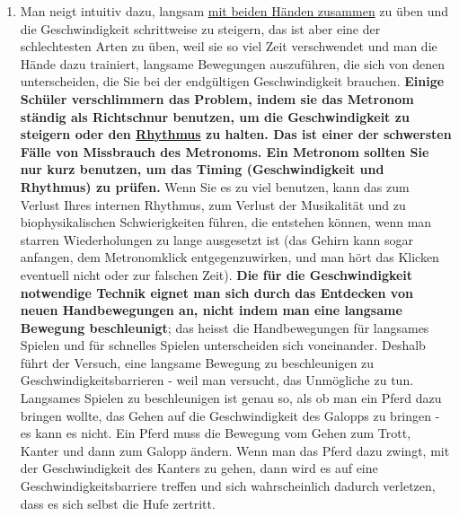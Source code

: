 \begin{enumerate}[label={\arabic*.}]
\item Man neigt intuitiv dazu, langsam \hyperref[c1ii25]{mit beiden Händen zusammen} zu üben und die Geschwindigkeit schrittweise zu steigern, das ist aber eine der schlechtesten Arten zu üben, weil sie so viel Zeit verschwendet und man die Hände dazu trainiert, langsame Bewegungen auszuführen, die sich von denen unterscheiden, die Sie bei der endgültigen Geschwindigkeit brauchen.
\textbf{Einige Schüler verschlimmern das Problem, indem sie das Metronom ständig  als Richtschnur benutzen, um die Geschwindigkeit zu steigern oder den \hyperref[c1iii1b]{Rhythmus} zu halten.
Das ist einer der schwersten Fälle von Missbrauch des Metronoms.
Ein Metronom sollten Sie nur kurz benutzen, um das Timing (Geschwindigkeit und Rhythmus) zu prüfen.}
Wenn Sie es zu viel benutzen, kann das zum Verlust Ihres internen Rhythmus, zum Verlust der Musikalität und zu biophysikalischen Schwierigkeiten führen, die entstehen können, wenn man starren Wiederholungen zu lange ausgesetzt ist (das Gehirn kann sogar anfangen, dem Metronomklick entgegenzuwirken, und man hört das Klicken eventuell nicht oder zur falschen Zeit).
\textbf{Die für die Geschwindigkeit notwendige Technik eignet man sich durch das Entdecken von neuen Handbewegungen an, nicht indem man eine langsame Bewegung beschleunigt}; das heisst die Handbewegungen für langsames Spielen und für schnelles Spielen unterscheiden sich voneinander.
Deshalb führt der Versuch, eine langsame Bewegung zu beschleunigen zu Geschwindigkeitsbarrieren - weil man versucht, das Unmögliche zu tun.
Langsames Spielen zu beschleunigen ist genau so, als ob man ein Pferd dazu bringen wollte, das Gehen auf die Geschwindigkeit des Galopps zu bringen - es kann es nicht.
Ein Pferd muss die Bewegung vom Gehen zum Trott, Kanter und dann zum Galopp ändern.
Wenn man das Pferd dazu zwingt, mit der Geschwindigkeit des Kanters zu gehen, dann wird es auf eine Geschwindigkeitsbarriere treffen und sich wahrscheinlich dadurch verletzen, dass es sich selbst die Hufe zertritt.


\end{enumerate}
